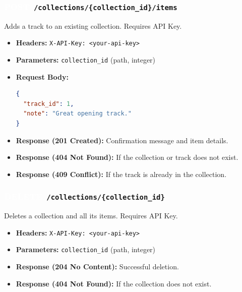 \documentclass[11pt,a4paper]{article}
\newcommand{\methodPOST}{\colorbox{postcolor}{\textcolor{white}{\textbf{POST}}}}
\newcommand{\methodDELETE}{\colorbox{deletecolor}{\textcolor{white}{\textbf{DELETE}}}}
\begin{document}
\subsubsection*{\methodPOST \texttt{ /collections/\{collection\_id\}/items}}
Adds a track to an existing collection. Requires API Key.
\begin{itemize}[label=\textcolor{primary}{\textbullet}, noitemsep]
    \item \textbf{Headers:} \texttt{X-API-Key: <your-api-key>}
    \item \textbf{Parameters:} \texttt{collection\_id} (path, integer)
    \item \textbf{Request Body:}
\begin{lstlisting}[language=json]
{
  "track_id": 1,
  "note": "Great opening track."
}
\end{lstlisting}
    \item \textbf{Response (201 Created):} Confirmation message and item details.
    \item \textbf{Response (404 Not Found):} If the collection or track does not exist.
    \item \textbf{Response (409 Conflict):} If the track is already in the collection.
\end{itemize}

\subsubsection*{\methodDELETE \texttt{ /collections/\{collection\_id\}}}
Deletes a collection and all its items. Requires API Key.
\begin{itemize}[label=\textcolor{primary}{\textbullet}, noitemsep]
    \item \textbf{Headers:} \texttt{X-API-Key: <your-api-key>}
    \item \textbf{Parameters:} \texttt{collection\_id} (path, integer)
    \item \textbf{Response (204 No Content):} Successful deletion.
    \item \textbf{Response (404 Not Found):} If the collection does not exist.
\end{itemize}
\end{document}
